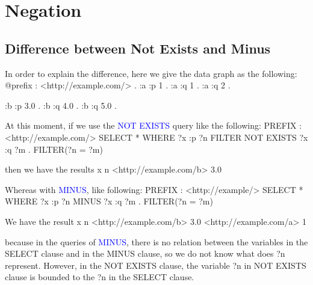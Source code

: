 \newenvironment{fullgreenverb}
{\verbbox}
{\endverbbox\par\colorbox[RGB]{204,255,204}{\parbox{\textwidth}{\theverbbox}}\par}

\newenvironment{fullblueverb}
{\verbbox}
{\endverbbox\par\colorbox[RGB]{204,229,255}{\parbox{\textwidth}{\theverbbox}}\par}
\newenvironment{fullgrayverb}
{\verbbox}
{\endverbbox\par\colorbox[RGB]{211,211,211}{\parbox{\textwidth}{\theverbbox}}\par}

\section{Negation}
\subsection{Difference between Not Exists and Minus}
In order to explain the difference, here we give the data graph as the following:
\begin{fullgreenverb}
@prefix : <http://example.com/> .
:a :p 1 .
:a :q 1 .
:a :q 2 .

:b :p 3.0 .
:b :q 4.0 .
:b :q 5.0 .
\end{fullgreenverb}
At this moment, if we use the \textcolor{blue}{NOT EXISTS} query like the following:
\begin{fullblueverb}
PREFIX : <http://example.com/>
SELECT * WHERE {
        ?x :p ?n
        FILTER NOT EXISTS {
                ?x :q ?m .
                FILTER(?n = ?m)
        }
}
\end{fullblueverb}
then we have the results
\begin{fullgrayverb}
x                           n
<http://example.com/b>      3.0
\end{fullgrayverb}
Whereas with \textcolor{blue}{MINUS}, like following:
\begin{fullblueverb}
PREFIX : <http://example/>
SELECT * WHERE {
        ?x :p ?n
        MINUS {
                ?x :q ?m .
                FILTER(?n = ?m)
        }
}
\end{fullblueverb}
We have the result
\begin{fullgrayverb}
x                           n
<http://example.com/b>      3.0
<http://example.com/a>	    1
\end{fullgrayverb}
because in the queries of \textcolor{blue}{MINUS}, there is no relation between the variables in the SELECT clause and in the MINUS clause, so we do not know what does ?n represent. However, in the NOT EXISTS clause, the variable ?n in NOT EXISTS clause is bounded to the ?n in the SELECT clause.
